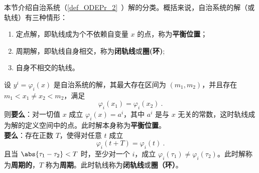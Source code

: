 
本节介绍自治系统（\autoref{def_ODEPr_2}~）解的分类。概括来说，自治系统的解（或轨线）有三种情形：
\begin{enumerate}
\item 定点解，即轨线成为个不依赖自变量 $x$ 的点，称为\textbf{平衡位置}；
\item 周期解，即轨线自身相交，称为\textbf{闭轨线}或\textbf{圈(环)};
\item 自身不相交的轨线。
\end{enumerate}
\begin{theorem}{}
设 $y^i=\varphi_i(x)$ 是自治系统的解，其最大存在区间为 $(m_1,m_2)$，并且存在 $m_1<x_1\neq x_2<m_2$，满足
\begin{equation}
\varphi_i(x_1)=\varphi_i(x_2)~.
\end{equation}
则\textbf{要么}：对一切值 $x$ 成立 $\varphi_i(x)=a^i$，其中 $a^i$ 是与 $x$ 无关的常数，这时轨线成为解的定义空间中的点。此时解本身称为\textbf{平衡位置}。\\
\textbf{要么}：存在正数 $T$，使得对任意 $t$ 成立
\begin{equation}
\varphi_i(t+T)=\varphi_i(t)~.
\end{equation}
且当 $\abs{\tau_1-\tau_2}<T$ 时，至少对一个 $i$，成立 $\varphi_i(\tau_1)\neq\varphi_i(\tau_2)$。此时解称为\textbf{周期的}，$T$ 称为\textbf{周期}。此时轨线称为\textbf{闭轨线}或\textbf{圈（环）}。

\end{theorem}














